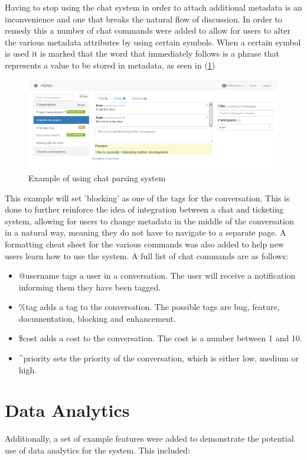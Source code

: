 \documentclass{l4proj}
\begin{document}
Having to stop using the chat system in order to attach additional metadata is an inconvenience and one that breaks the natural flow of discussion.  In order to remedy this a number of chat commands were added to allow for users to alter the various metadata attributes by using certain symbols. When a certain symbol is used it is marked that the word that immediately follows is a phrase that represents a value to be stored in metadata, as seen in (\ref{fig:10})

\begin{figure}[h]
\includegraphics[scale=0.75]{chat-parsing.png}
\centering
\caption{Example of using chat parsing system}
\label{fig:10}
\end{figure}
\newpage

This example will set 'blocking' as one of the tags for the conversation.  This is done to further reinforce the idea of integration between a chat and ticketing system, allowing for users to change metadata in the middle of the conversation in a natural way, meaning they do not have to navigate to a separate page.  A formatting cheat sheet for the various commands was also added to help new users learn how to use the system.  A full list of chat commands are as follows:

\begin{itemize}
\item @username tags a user in a conversation.  The user will receive a notification informing them they have been tagged.
\item \%tag adds a tag to the conversation.  The possible tags are bug, feature, documentation, blocking and enhancement.
\item \$cost adds a cost to the conversation.  The cost is a number between 1 and 10.
\item \textasciicircum priority sets the priority of the conversation, which is either low, medium or high.
\end{itemize}

\newpage

\section{Data Analytics}
Additionally, a set of example features were added to demonstrate the potential use of data analytics for the system.  This included:
\end{document}
